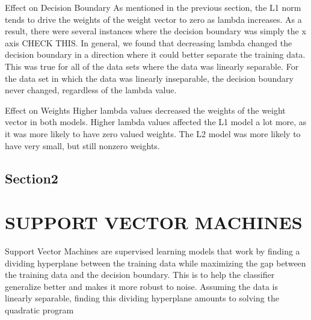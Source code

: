 \documentclass[10pt,twoside]{article}
\begin{document}
Effect on Decision Boundary 
As mentioned in the previous section, the L1 norm tends to drive the weights of the weight vector to zero as lambda increases. As a result, there were several instances where the decision boundary was simply the x axis CHECK THIS. In general, we found that decreasing lambda changed the decision boundary in a direction where it could better separate the training data. This was true for all of the data sets where the data was linearly separable. For the data set in which the data was linearly inseparable, the decision boundary never changed, regardless of the lambda value. 

Effect on Weights
Higher lambda values decreased the weights of the weight vector in both models. Higher lambda values affected the L1 model a lot more, as it was more likely to have zero valued weights. The L2 model was more likely to have very small, but still nonzero weights. 


\subsection{Section2}




\section{\uppercase{Support Vector Machines}}

Support Vector Machines are supervised learning models that work by finding a dividing hyperplane between the training data while maximizing the gap between the training data and the decision boundary. This is to help the classifier generalize better and makes it more robust to noise. Assuming the data is linearly separable, finding this dividing hyperplane amounts to solving the quadratic program


\end{document}
